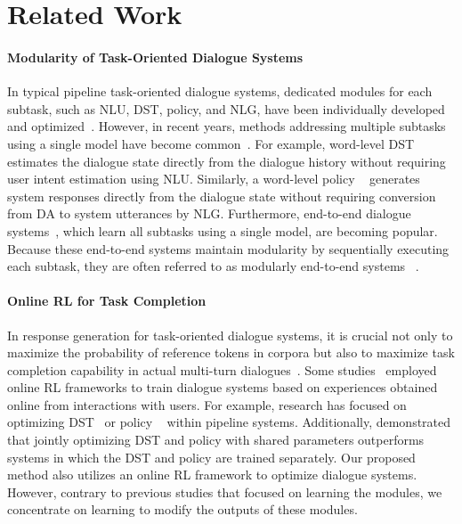\section{Related Work}
\paragraph{Modularity of Task-Oriented Dialogue Systems}
In typical pipeline task-oriented dialogue systems, dedicated modules for each subtask, such as NLU, DST, policy, and NLG, have been individually developed and optimized~\citep{zhang2020recent}. However, in recent years, methods addressing multiple subtasks using a single model have become common~\citep{ni2022recent}. For example, word-level DST~\citep{wu-etal-2019-transferable, zhao2022description} estimates the dialogue state directly from the dialogue history without requiring user intent estimation using NLU. Similarly, a word-level policy ~\citep{lubis-etal-2020-lava, wang-etal-2020-multi-domain} generates system responses directly from the dialogue state without requiring conversion from DA to system utterances by NLG. Furthermore, end-to-end dialogue systems~\citep{NEURIPS2020_e9462095, He_Dai_Zheng_Wu_Cao_Liu_Jiang_Yang_Huang_Si_Sun_Li_2022, wu-etal-2023-diacttod}, which learn all subtasks using a single model, are becoming popular. Because these end-to-end systems maintain modularity by sequentially executing each subtask, they are often referred to as modularly end-to-end systems ~\citep{qin-etal-2023-end}.

\paragraph{Online RL for Task Completion}
In response generation for task-oriented dialogue systems, it is crucial not only to maximize the probability of reference tokens in corpora but also to maximize task completion capability in actual multi-turn dialogues~\citep{kwan2023survey}. Some studies~\citep{liu-etal-2018-dialogue, tseng-etal-2021-transferable} employed online RL frameworks to train dialogue systems based on experiences obtained online from interactions with users. For example,  research has focused on optimizing DST~\citep{10.1007/978-981-99-2401-1_25} or policy ~\citep{li-etal-2020-guided, deng2024plugandplay} within pipeline systems. Additionally, \citet{zhao-eskenazi-2016-towards} demonstrated that jointly optimizing DST and policy with shared parameters outperforms systems in which the DST and policy are trained separately. Our proposed method also utilizes an online RL framework  to optimize dialogue systems. However, contrary to previous studies that focused on learning the modules, we concentrate on learning to modify the outputs of these modules.


